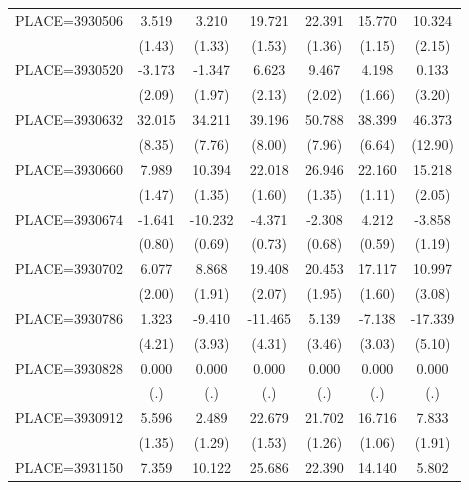 {\begin{tabular}{l*{6}{c}}
PLACE=3930506       &       3.519&       3.210&      19.721&      22.391&      15.770&      10.324\\
                    &      (1.43)&      (1.33)&      (1.53)&      (1.36)&      (1.15)&      (2.15)\\
PLACE=3930520       &      -3.173&      -1.347&       6.623&       9.467&       4.198&       0.133\\
                    &      (2.09)&      (1.97)&      (2.13)&      (2.02)&      (1.66)&      (3.20)\\
PLACE=3930632       &      32.015&      34.211&      39.196&      50.788&      38.399&      46.373\\
                    &      (8.35)&      (7.76)&      (8.00)&      (7.96)&      (6.64)&     (12.90)\\
PLACE=3930660       &       7.989&      10.394&      22.018&      26.946&      22.160&      15.218\\
                    &      (1.47)&      (1.35)&      (1.60)&      (1.35)&      (1.11)&      (2.05)\\
PLACE=3930674       &      -1.641&     -10.232&      -4.371&      -2.308&       4.212&      -3.858\\
                    &      (0.80)&      (0.69)&      (0.73)&      (0.68)&      (0.59)&      (1.19)\\
PLACE=3930702       &       6.077&       8.868&      19.408&      20.453&      17.117&      10.997\\
                    &      (2.00)&      (1.91)&      (2.07)&      (1.95)&      (1.60)&      (3.08)\\
PLACE=3930786       &       1.323&      -9.410&     -11.465&       5.139&      -7.138&     -17.339\\
                    &      (4.21)&      (3.93)&      (4.31)&      (3.46)&      (3.03)&      (5.10)\\
PLACE=3930828       &       0.000&       0.000&       0.000&       0.000&       0.000&       0.000\\
                    &         (.)&         (.)&         (.)&         (.)&         (.)&         (.)\\
PLACE=3930912       &       5.596&       2.489&      22.679&      21.702&      16.716&       7.833\\
                    &      (1.35)&      (1.29)&      (1.53)&      (1.26)&      (1.06)&      (1.91)\\
PLACE=3931150       &       7.359&      10.122&      25.686&      22.390&      14.140&       5.802\\

\end{tabular}}
